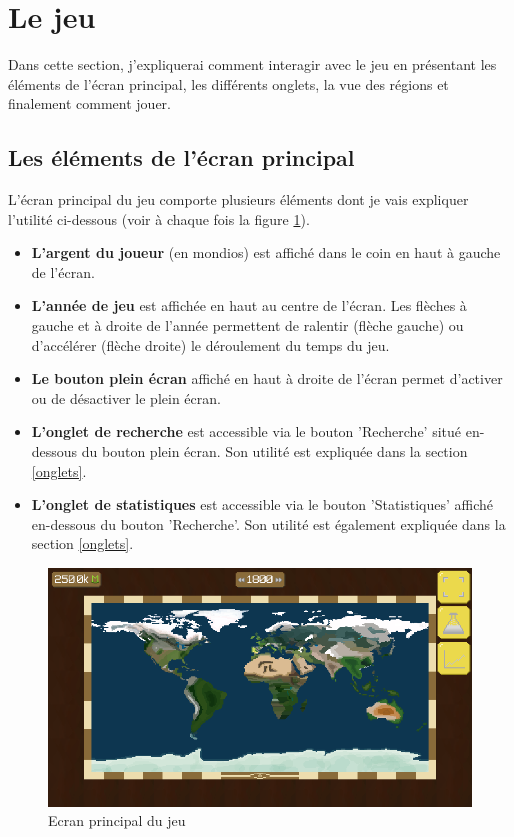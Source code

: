 \documentclass{article}
\begin{document}
        \section{Le jeu}
		Dans cette section, j'expliquerai comment interagir avec le jeu en présentant les éléments de l'écran principal, les différents onglets, la vue des régions et finalement comment jouer.        
        
        \subsection{Les éléments de l'écran principal}\label{mainScreenEls}
		L'écran principal du jeu comporte plusieurs éléments dont je vais expliquer l'utilité ci-dessous (voir à chaque fois la figure \ref{fig:worldView}).
		
		\begin{itemize}
			\item \textbf{L'argent du joueur} (en mondios) est affiché dans le coin en haut à gauche de l'écran.
			\item \textbf{L'année de jeu} est affichée en haut au centre de l'écran. Les flèches à gauche et à droite de l'année permettent de ralentir (flèche gauche) ou d’accélérer (flèche droite) le déroulement du temps du jeu.
			\item \textbf{Le bouton plein écran} affiché en haut à droite de l'écran permet d'activer ou de désactiver le plein écran.
			\item \textbf{L'onglet de recherche} est accessible via le bouton 'Recherche' situé en-dessous du bouton plein écran. Son utilité est expliquée dans la section \ref{onglets}.
			\item  \textbf{L'onglet de statistiques} est accessible via le bouton 'Statistiques' affiché en-dessous du bouton 'Recherche'. Son utilité est également expliquée dans la section \ref{onglets}.
		\end{itemize}
		
		\begin{figure}[H]
                \includegraphics[width=\linewidth]{../images/worldView}
                \caption{Ecran principal du jeu}
                \label{fig:worldView}
        \end{figure} 
		
\end{document}
